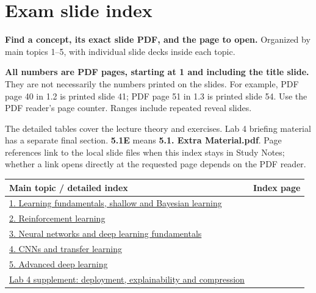 \documentclass[10pt]{article}
\begin{document}
\section{Exam slide index}
\textbf{Find a concept, its exact slide PDF, and the page to open.}
Organized by main topics 1--5, with individual slide decks inside each topic.

\textbf{All numbers are PDF pages, starting at 1 and including the title slide.}
They are not necessarily the numbers printed on the slides. For example, PDF page 40
in 1.2 is printed slide 41; PDF page 51 in 1.3 is printed slide 54.
Use the PDF reader's page counter. Ranges include repeated reveal slides.

The detailed tables cover the lecture theory and exercises. Lab 4 briefing material
has a separate final section. \textbf{5.1E} means \textbf{5.1. Extra Material.pdf}.
Page references link to the local slide files when this index stays in Study Notes;
whether a link opens directly at the requested page depends on the PDF reader.

\begin{tabular}{@{}P{.84\linewidth}r@{}}
\toprule\textbf{Main topic / detailed index} & \textbf{Index page}\\\midrule
\hyperref[topic1]{1. Learning fundamentals, shallow and Bayesian learning} & \pageref{topic1}\\
\hyperref[topic2]{2. Reinforcement learning} & \pageref{topic2}\\
\hyperref[topic3]{3. Neural networks and deep learning fundamentals} & \pageref{topic3}\\
\hyperref[topic4]{4. CNNs and transfer learning} & \pageref{topic4}\\
\hyperref[topic5]{5. Advanced deep learning} & \pageref{topic5}\\
\hyperref[topicL4]{Lab 4 supplement: deployment, explainability and compression} & \pageref{topicL4}\\
\bottomrule\end{tabular}
\end{document}
